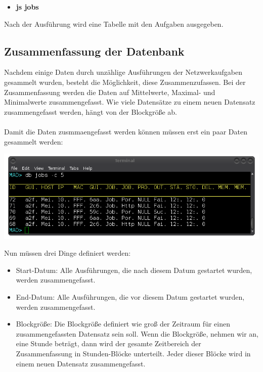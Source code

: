 \documentclass[12pt,a4paper]{report}
\begin{document}
\begin{onehalfspace}
\begin{itemize}
\item \textbf{js jobs}
\end{itemize}

Nach der Ausführung wird eine Tabelle mit den Aufgaben ausgegeben.

\subsection{Zusammenfassung der Datenbank}

Nachdem einige Daten durch unzählige Ausführungen der Netzwerkaufgaben gesammelt wurden, besteht die Möglichkeit, diese Zusammenzufassen. Bei der Zusammenfassung werden die Daten auf Mittelwerte, Maximal- und Minimalwerte zusammengefasst. Wie viele Datensätze zu einem neuen Datensatz zusammengefasst werden, hängt von der Blockgröße ab.\\\\
Damit die Daten zusmmaengefasst werden können müssen erst ein paar Daten gesammelt werden:

\begin{center}
\includegraphics[scale=0.6]{img/db_jobs2.png}
\end{center}

Nun müssen drei Dinge definiert werden:

\begin{itemize}
\item Start-Datum: Alle Ausführungen, die nach diesem Datum gestartet wurden, werden zusammengefasst.
\item End-Datum: Alle Ausführungen, die vor diesem Datum gestartet wurden, werden zusammengefasst.
\item Blockgröße: Die Blockgröße definiert wie groß der Zeitraum für einen zusammengefassten Datensatz sein soll. Wenn die Blockgröße, nehmen wir an, eine Stunde beträgt, dann wird der gesamte Zeitbereich der Zusammenfassung in Stunden-Blöcke unterteilt. Jeder dieser Blöcke wird in einem neuen Datensatz zusammengefasst.
\end{itemize}


\end{onehalfspace}
\end{document}

